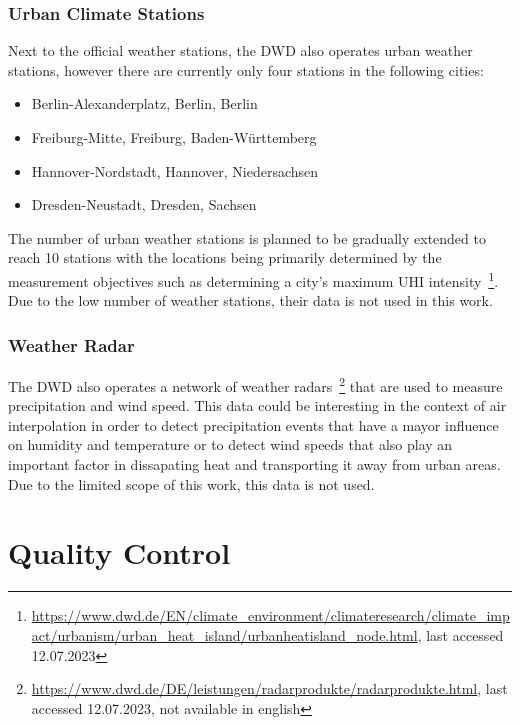 \subsubsection{Urban Climate Stations}

Next to the official weather stations, the DWD also operates urban weather stations, however there are currently only four stations in the following cities:

\begin{itemize}
    \item Berlin-Alexanderplatz, Berlin, Berlin
    \item Freiburg-Mitte, Freiburg, Baden-Württemberg
    \item Hannover-Nordstadt, Hannover, Niedersachsen
    \item Dresden-Neustadt, Dresden, Sachsen
\end{itemize}

The number of urban weather stations is planned to be gradually extended to reach 10 stations with the locations being primarily determined by the measurement objectives such as determining a city's maximum UHI intensity~\footnote{\url{https://www.dwd.de/EN/climate\_environment/climateresearch/climate\_impact/urbanism/urban\_heat\_island/urbanheatisland\_node.html}, last accessed 12.07.2023}. Due to the low number of weather stations, their data is not used in this work.

\subsubsection{Weather Radar}

The DWD also operates a network of weather radars~\footnote{\url{https://www.dwd.de/DE/leistungen/radarprodukte/radarprodukte.html}, last accessed 12.07.2023, not available in english} that are used to measure precipitation and wind speed. This data could be interesting in the context of air interpolation in order to detect precipitation events that have a mayor influence on humidity and temperature or to detect wind speeds that also play an important factor in dissapating heat and transporting it away from urban areas.
Due to the limited scope of this work, this data is not used.

\section{Quality Control}

